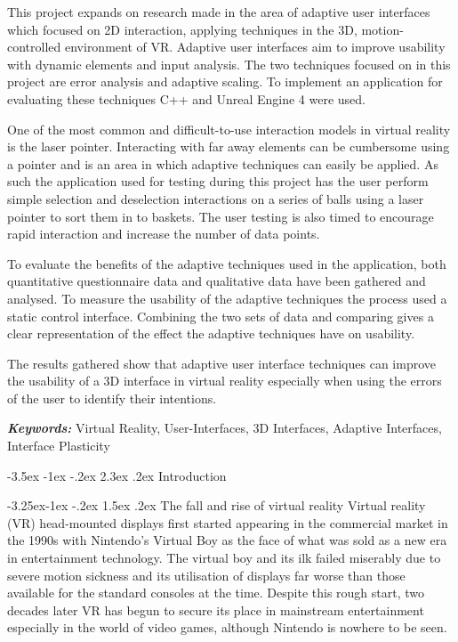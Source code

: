 \documentclass[12pt]{article}
\makeatletter
\providecommand{\keywords}[1]
{\textbf{\textit{Keywords: }} #1}
\renewcommand{\section}{\@startsection {section}{1}{\z@}%
             {-3.5ex \@plus -1ex \@minus -.2ex}%
             {2.3ex \@plus .2ex}%
             {\normalfont\Large\scshape\bfseries}}
\renewcommand{\subsection}{\@startsection{subsection}{2}{\z@}%
             {-3.25ex\@plus -1ex \@minus -.2ex}%
             {1.5ex \@plus .2ex}%
             {\normalfont\large\scshape\bfseries}}
\makeatother
\begin{document}
This project expands on research made in the area of adaptive user interfaces which focused on 2D interaction, applying techniques in the 3D, motion-controlled environment of VR. Adaptive user interfaces aim to improve usability with dynamic elements and input analysis. The two techniques focused on in this project are error analysis and adaptive scaling. To implement an application for evaluating these techniques C++ and Unreal Engine 4 were used.

One of the most common and difficult-to-use interaction models in virtual reality is the laser pointer. Interacting with far away elements can be cumbersome using a pointer and is an area in which adaptive techniques can easily be applied. As such the application used for testing during this project has the user perform simple selection and deselection interactions on a series of balls using a laser pointer to sort them in to baskets. The user testing is also timed to encourage rapid interaction and increase the number of data points.

To evaluate the benefits of the adaptive techniques used in the application, both quantitative questionnaire data and qualitative data have been gathered and analysed. To measure the usability of the adaptive techniques the process used a static control interface. Combining the two sets of data and comparing gives a clear representation of the effect the adaptive techniques have on usability.

The results gathered show that adaptive user interface techniques can improve the usability of a 3D interface in virtual reality especially when using the errors of the user to identify their intentions.

\keywords{Virtual Reality, User-Interfaces, 3D Interfaces, Adaptive Interfaces, Interface Plasticity}

\section{Introduction}

\subsection{The fall and rise of virtual reality}
Virtual reality (VR) head-mounted displays first started appearing in the commercial market in the 1990s with Nintendo's Virtual Boy as the face of what was sold as a new era in entertainment technology. The virtual boy and its ilk failed miserably due to severe motion sickness and its utilisation of displays far worse than those available for the standard consoles at the time. Despite this rough start, two decades later VR has begun to secure its place in mainstream entertainment especially in the world of video games, although Nintendo is nowhere to be seen. 
\end{document}
